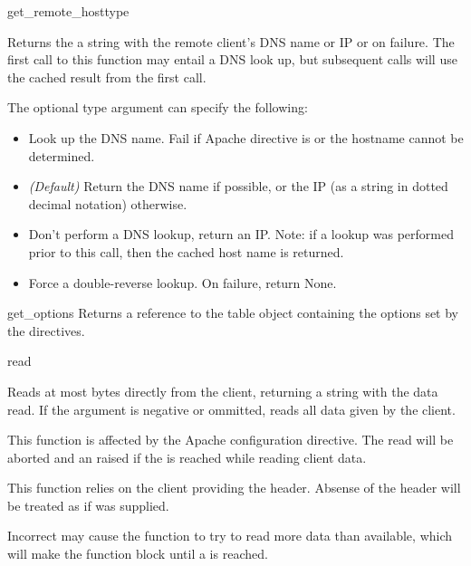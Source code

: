 \begin{methoddesc}[request]{get_remote_host}{type}

Returns the a string with the remote client's DNS name or IP or
 on failure. The first call to this function may entail a
DNS look up, but subsequent calls will use the cached result from the
first call.

The optional type argument can specify the following: 

\begin{itemize}

\item
{} Look up the DNS name. Fail if Apache 
directive  is  or the hostname cannot
be determined.

\item                  
{} \emph{(Default)} Return the DNS name if
possible, or the IP (as a string in dotted decimal notation)
otherwise.

\item
{} Don't perform a DNS lookup, return an
IP. Note: if a lookup was performed prior to this call, then the
cached host name is returned.

\item
{} Force a double-reverse lookup. On 
failure, return None.

\end{itemize}

\end{methoddesc}

\begin{methoddesc}[request]{get_options}{}
Returns a reference to the table object containing the options set by
the  directives.
\end{methoddesc}


\begin{methoddesc}[request]{read}{}

Reads at most  bytes directly from the client, returning a
string with the data read. If the  argument is negative or
ommitted, reads all data given by the client.

This function is affected by the  Apache configuration
directive. The read will be aborted and an  raised
if the  is reached while reading client data.

This function relies on the client providing the 
header. Absense of the  header will be treated as
if  was supplied.

Incorrect  may cause the function to try to read
more data than available, which will make the function block until a
 is reached.

\end{methoddesc}

